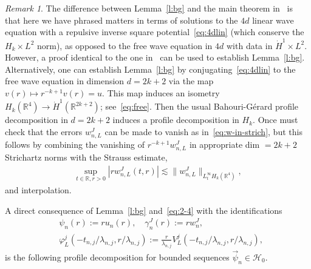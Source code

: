 \documentclass[10pt,reqno]{amsart}
\newcommand{\HH}{\mathcal{H}}
\newcommand{\R}{\mathbb{R}}
\newcommand{\ga}{\gamma}
\newcommand{\fy}{\varphi}
\newcommand{\la}{\lambda}
\newcommand{\abs}[1]{\left\lvert{#1}\right\rvert}
\newcommand{\EQ}[1]{\begin{equation}\begin{split} #1 \end{split}\end{equation}}
\numberwithin{equation}{section}
\theoremstyle{remark}
\newtheorem{rem}[thm]{Remark}
\newcommand{\0}{\emptyset}
\begin{document}
\begin{rem}
The difference between Lemma~\ref{l:bg} and the main theorem in~\cite{BG} is that here we have phrased matters in terms of solutions to the $4d$ linear wave equation with a repulsive inverse square potential~\eqref{eq:4dlin} (which conserve the $H_k \times L^2$ norm), as opposed to the free wave equation in $4d$ with data in $\dot H^1 \times L^2$.  However, a proof identical to the one in~\cite{BG} can be used to establish Lemma~\ref{l:bg}. Alternatively, one can establish Lemma~\ref{l:bg} by conjugating~\eqref{eq:4dlin} to the free wave equation in dimension $d = 2k+2$ via the map $v(r) \mapsto r^{-k+1} v(r) = u$. This map induces an isometry $H_k(\R^4) \to \dot{H}^1(\R^{2k+2})$; see~\eqref{eq:free}. Then the usual Bahouri-G\'erard profile decomposition in $d=2k+2$ induces a profile decomposition in $H_k$.  Once must check that the errors $w_{n, L}^J$ can be made to vanish as in~\eqref{eq:w-in-strich}, but this follows by combining the vanishing of $r^{-k+1}w_{n, L}^J$ in appropriate dim $=2k+2$ Strichartz norms with the Strauss estimate, 
\EQ{
 \sup_{t \in \R, r >0} \abs{r w_{n, L}^J(t, r) }\lesssim \|w_{n, L}^J \|_{L^{\infty}_t H_k(\R^4)}, 
 }
 and interpolation. 

\end{rem} 

A direct consequence of Lemma~\ref{l:bg} and~\eqref{eq:2-4}  with the identifications 
\EQ{  \label{ident}
& \psi_n(r) := r u_n(r), \quad  \ga_n^J(r)  := r w_n^J, \\
& \fy^j_L( -t_{n, j}/ \la_{n, j}, r/ \la_{n, j}) := \frac{r}{\la_{n, j}}V^j_L( -t_{n, j}/ \la_{n, j}, r/ \la_{n, j}),
}
is the following profile decomposition for bounded sequences $\vec \psi_n \in \HH_0$.
\end{document}
